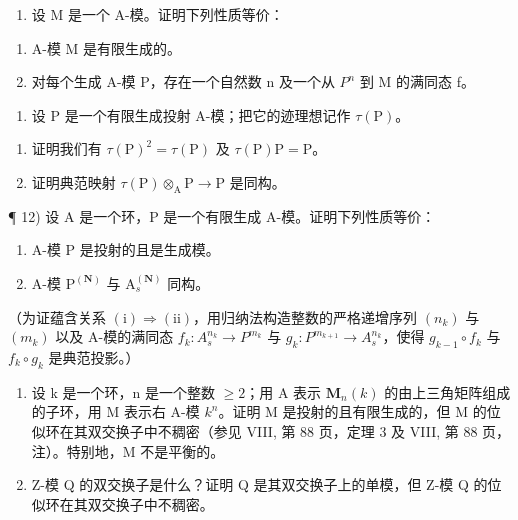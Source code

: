 \begin{enumerate}
\def\labelenumi{\arabic{enumi})}
\setcounter{enumi}{9}
\tightlist
\item
  设 M 是一个 A-模。证明下列性质等价：
\end{enumerate}

\begin{enumerate}
\def\labelenumi{(\roman{enumi})}
\item
  A-模 M 是有限生成的。
\item
  对每个生成 A-模 P，存在一个自然数 n 及一个从 \(P^{n}\) 到 M 的满同态 f。
\end{enumerate}

\begin{enumerate}
\def\labelenumi{\arabic{enumi})}
\setcounter{enumi}{10}
\tightlist
\item
  设 \(\mathrm{P}\) 是一个有限生成投射 A-模；把它的迹理想记作 \(\tau(\mathrm{P})\)。\\
\end{enumerate}

\begin{enumerate}
\def\labelenumi{\alph{enumi})}
\item
  证明我们有 \(\tau(\mathrm{P})^2 = \tau(\mathrm{P})\) 及 \(\tau(\mathrm{P})\mathrm{P} = \mathrm{P}\)。
\item
  证明典范映射 \(\tau(\mathrm{P})\otimes_{\mathrm{A}}\mathrm{P}\to\mathrm{P}\) 是同构。
\end{enumerate}

¶ 12) 设 A 是一个环，P 是一个有限生成 A-模。证明下列性质等价：

\begin{enumerate}
\def\labelenumi{(\roman{enumi})}
\item
  A-模 P 是投射的且是生成模。
\item
  A-模 \(\mathrm{P}^{(\mathbf{N})}\) 与 \(\mathrm{A}_s^{(\mathbf{N})}\) 同构。
\end{enumerate}

（为证蕴含关系 \((\mathrm{i})\Rightarrow(\mathrm{ii})\)，用归纳法构造整数的严格递增序列 \((n_{k})\) 与 \((m_{k})\) 以及 A-模的满同态 \(f_{k}:A_{s}^{n_{k}}\to P^{m_{k}}\) 与 \(g_{k}:P^{m_{k+1}}\to A_{s}^{n_{k}}\)，使得 \(g_{k-1}\circ f_{k}\) 与 \(f_{k}\circ g_{k}\) 是典范投影。）

\begin{enumerate}
\def\labelenumi{\arabic{enumi})}
\setcounter{enumi}{12}
\item
  设 k 是一个环，n 是一个整数 \(\geqslant 2\)；用 A 表示 \(\mathbf{M}_{n}(k)\) 的由上三角矩阵组成的子环，用 M 表示右 A-模 \(k^{n}\)。证明 M 是投射的且有限生成的，但 M 的位似环在其双交换子中不稠密（参见 VIII, 第 88 页，定理 3 及 VIII, 第 88 页，注）。特别地，M 不是平衡的。
\item
  Z-模 Q 的双交换子是什么？证明 Q 是其双交换子上的单模，但 Z-模 Q 的位似环在其双交换子中不稠密。
\end{enumerate}

